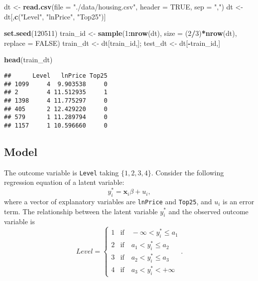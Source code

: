 \documentclass[
  12pt,
]{article}
\newenvironment{Shaded}{\begin{snugshade}}{\end{snugshade}}
\newcommand{\DataTypeTok}[1]{\textcolor[rgb]{0.13,0.29,0.53}{#1}}
\newcommand{\DecValTok}[1]{\textcolor[rgb]{0.00,0.00,0.81}{#1}}
\newcommand{\KeywordTok}[1]{\textcolor[rgb]{0.13,0.29,0.53}{\textbf{#1}}}
\newcommand{\NormalTok}[1]{#1}
\newcommand{\OperatorTok}[1]{\textcolor[rgb]{0.81,0.36,0.00}{\textbf{#1}}}
\newcommand{\OtherTok}[1]{\textcolor[rgb]{0.56,0.35,0.01}{#1}}
\newcommand{\StringTok}[1]{\textcolor[rgb]{0.31,0.60,0.02}{#1}}
\begin{document}
\begin{Shaded}
\begin{Highlighting}[]
\NormalTok{dt \textless{}{-}}\StringTok{ }\KeywordTok{read.csv}\NormalTok{(}\DataTypeTok{file =} \StringTok{"./data/housing.csv"}\NormalTok{, }\DataTypeTok{header =} \OtherTok{TRUE}\NormalTok{,  }\DataTypeTok{sep =} \StringTok{","}\NormalTok{)}
\NormalTok{dt \textless{}{-}}\StringTok{ }\NormalTok{dt[,}\KeywordTok{c}\NormalTok{(}\StringTok{"Level"}\NormalTok{, }\StringTok{"lnPrice"}\NormalTok{, }\StringTok{"Top25"}\NormalTok{)]}

\KeywordTok{set.seed}\NormalTok{(}\DecValTok{120511}\NormalTok{)}
\NormalTok{train\_id \textless{}{-}}\StringTok{ }\KeywordTok{sample}\NormalTok{(}\DecValTok{1}\OperatorTok{:}\KeywordTok{nrow}\NormalTok{(dt), }\DataTypeTok{size =}\NormalTok{ (}\DecValTok{2}\OperatorTok{/}\DecValTok{3}\NormalTok{)}\OperatorTok{*}\KeywordTok{nrow}\NormalTok{(dt), }\DataTypeTok{replace =} \OtherTok{FALSE}\NormalTok{)}
\NormalTok{train\_dt \textless{}{-}}\StringTok{ }\NormalTok{dt[train\_id,]; test\_dt \textless{}{-}}\StringTok{ }\NormalTok{dt[}\OperatorTok{{-}}\NormalTok{train\_id,]}

\KeywordTok{head}\NormalTok{(train\_dt)}
\end{Highlighting}
\end{Shaded}

\begin{verbatim}
##      Level   lnPrice Top25
## 1099     4  9.903538     0
## 2        4 11.512935     1
## 1398     4 11.775297     0
## 405      2 12.429220     0
## 579      1 11.289794     0
## 1157     1 10.596660     0
\end{verbatim}

\hypertarget{model}{%
\subsection{Model}\label{model}}

The outcome variable is \texttt{Level} taking \(\{1, 2, 3, 4\}\).
Consider the following regression equation of a latent variable:
\begin{equation*}
  y_i^* = \mathbf{x}_i \beta + u_i,
\end{equation*} where a vector of explanatory variables are
\texttt{lnPrice} and \texttt{Top25}, and \(u_i\) is an error term. The
relationship between the latent variable \(y_i^*\) and the observed
outcome variable is \begin{equation*}
  Level =
  \begin{cases}
    1 &\text{if}\quad -\infty < y_i^* \le a_1  \\
    2 &\text{if}\quad a_1 < y_i^* \le a_2 \\
    3 &\text{if}\quad a_2 < y_i^* \le a_3 \\
    4 &\text{if}\quad a_3 < y_i^* < +\infty
  \end{cases}.
\end{equation*}
\end{document}
